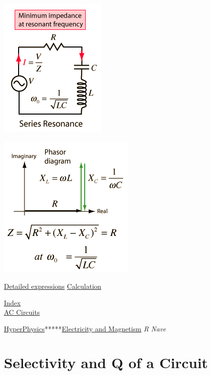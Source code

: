 \includegraphics{./resonant-rlc-circuits_files/acres2.png}\strut

\includegraphics{./resonant-rlc-circuits_files/acres3.png}


\href{http://hyperphysics.phy-astr.gsu.edu/hbase/electric/rlcser.html\#c1}{Detailed
expressions} 
\href{http://hyperphysics.phy-astr.gsu.edu/hbase/electric/rlcser.html\#c2}{Calculation}\tabularnewline

\href{http://hyperphysics.phy-astr.gsu.edu/hbase/hframe.html}{Index}\\[2\baselineskip]\href{http://hyperphysics.phy-astr.gsu.edu/hbase/electric/accircon.html\#c1}{AC
Circuits}\strut

\href{http://hyperphysics.phy-astr.gsu.edu/hbase/hph.html}{HyperPhysics}*****\href{http://hyperphysics.phy-astr.gsu.edu/hbase/emcon.html\#emcon}{Electricity
and Magnetism} \emph{R Nave}

\protect\hypertarget{c3}{}{}

\section{Selectivity and Q of a
Circuit}\label{selectivity-and-q-of-a-circuit}

